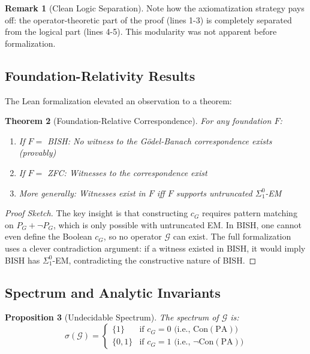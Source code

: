 \documentclass[11pt]{article}
\newtheorem{theorem}{Theorem}[section]
\newtheorem{proposition}[theorem]{Proposition}
\theoremstyle{definition}
\newtheorem{remark}[theorem]{Remark}
\newcommand{\SigOne}{\Sigma^{0}_{\!1}}
\newcommand{\PA}{\mathrm{PA}}
\newcommand{\Con}{\mathrm{Con}}
\begin{document}
\begin{remark}[Clean Logic Separation]
Note how the axiomatization strategy pays off: the operator-theoretic part of the proof (lines 1-3) is completely separated from the logical part (lines 4-5). This modularity was not apparent before formalization.
\end{remark}

\subsection{Foundation-Relativity Results}

The Lean formalization elevated an observation to a theorem:

\begin{theorem}[Foundation-Relative Correspondence]\label{thm:foundation_rel}
For any foundation $F$:
\begin{enumerate}
\item If $F = $ BISH: No witness to the Gödel-Banach correspondence exists (provably)
\item If $F = $ ZFC: Witnesses to the correspondence exist
\item More generally: Witnesses exist in $F$ iff $F$ supports untruncated $\SigOne$-EM
\end{enumerate}
\end{theorem}

\begin{proof}[Proof Sketch]
The key insight is that constructing $c_G$ requires pattern matching on $P_G + \neg P_G$, which is only possible with untruncated EM. In BISH, one cannot even define the Boolean $c_G$, so no operator $\mathcal{G}$ can exist. The full formalization uses a clever contradiction argument: if a witness existed in BISH, it would imply BISH has $\SigOne$-EM, contradicting the constructive nature of BISH.
\end{proof}

\subsection{Spectrum and Analytic Invariants}

\begin{proposition}[Undecidable Spectrum]\label{prop:spectrum}
The spectrum of $\mathcal{G}$ is:
\[
\sigma(\mathcal{G}) = \begin{cases}
\{1\} & \text{if } c_G = 0 \text{ (i.e., } \Con(\PA)\text{)} \\
\{0,1\} & \text{if } c_G = 1 \text{ (i.e., } \neg\Con(\PA)\text{)}
\end{cases}
\]
\end{proposition}
\end{document}
